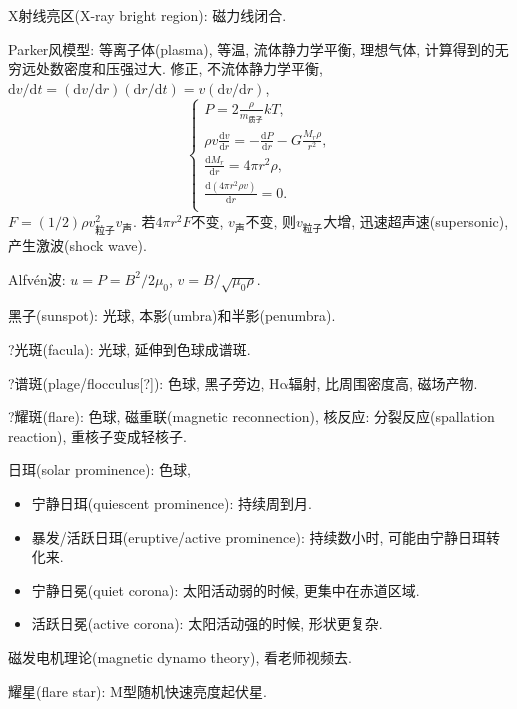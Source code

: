 X射线亮区(X-ray bright region): 磁力线闭合.

Parker风模型: 等离子体(plasma), 等温, 流体静力学平衡, 理想气体, 计算得到的无穷远处数密度和压强过大. 修正, 不流体静力学平衡, $\mathrm{d}v/\mathrm{d}t=(\mathrm{d}v/\mathrm{d}r)(\mathrm{d}r/\mathrm{d}t)=v(\mathrm{d}v/\mathrm{d}r)$,
\begin{equation*}
    \begin{cases}
        P = 2\frac{\rho}{m_\text{质子}}kT, \\
        \rho v \frac{\mathrm{d}v}{\mathrm{d}r}=-\frac{\mathrm{d}P}{\mathrm{d}r}-G\frac{M_r\rho}{r^2}, \\
        \frac{\mathrm{d}M_r}{\mathrm{d}r}=4\pi r^2\rho, \\
        \frac{\mathrm{d}(4\pi r^2\rho v)}{\mathrm{d}r}=0. \\
    \end{cases}
\end{equation*}
$F=(1/2)\rho v_\text{粒子}^2v_\text{声}$. 若$4\pi r^2F$不变, $v_\text{声}$不变, 则$v_\text{粒子}$大增, 迅速超声速(supersonic), 产生激波(shock wave).

Alfv\'en波: $u=P=B^2/2\mu_0$, $v=B/\sqrt{\mu_0\rho}$.

黑子(sunspot): 光球, 本影(umbra)和半影(penumbra).

?光斑(facula): 光球, 延伸到色球成谱斑.

?谱斑(plage/flocculus[?]): 色球, 黑子旁边, H$\mathrm{\alpha}$辐射, 比周围密度高, 磁场产物.

?耀斑(flare): 色球, 磁重联(magnetic reconnection), 核反应: 分裂反应(spallation reaction), 重核子变成轻核子.

日珥(solar prominence): 色球,
\begin{itemize}
    \item 宁静日珥(quiescent prominence): 持续周到月.
    \item 暴发/活跃日珥(eruptive/active prominence): 持续数小时, 可能由宁静日珥转化来.
\end{itemize}

\begin{itemize}
    \item 宁静日冕(quiet corona): 太阳活动弱的时候, 更集中在赤道区域.
    \item 活跃日冕(active corona): 太阳活动强的时候, 形状更复杂.
\end{itemize}

磁发电机理论(magnetic dynamo theory), 看老师视频去.

耀星(flare star): M型随机快速亮度起伏星.
